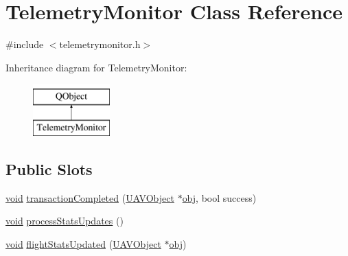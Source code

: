 \hypertarget{class_telemetry_monitor}{\section{Telemetry\-Monitor Class Reference}
\label{class_telemetry_monitor}
}


{\ttfamily \#include $<$telemetrymonitor.\-h$>$}

Inheritance diagram for Telemetry\-Monitor\-:\begin{figure}[H]
\begin{center}
\leavevmode
\includegraphics[height=2.000000cm]{class_telemetry_monitor}
\end{center}
\end{figure}
\subsection*{Public Slots}
\begin{DoxyCompactItemize}
\item 
\hyperlink{group___u_a_v_objects_plugin_ga444cf2ff3f0ecbe028adce838d373f5c}{void} \hyperlink{group___u_a_v_talk_plugin_ga2b5452341c351cd2d67c46469b855607}{transaction\-Completed} (\hyperlink{class_u_a_v_object}{U\-A\-V\-Object} $\ast$\hyperlink{glext_8h_a0c0d4701a6c89f4f7f0640715d27ab26}{obj}, bool success)
\item 
\hyperlink{group___u_a_v_objects_plugin_ga444cf2ff3f0ecbe028adce838d373f5c}{void} \hyperlink{group___u_a_v_talk_plugin_ga2e16b3d1a298f851879d22749d1e38e9}{process\-Stats\-Updates} ()
\item 
\hyperlink{group___u_a_v_objects_plugin_ga444cf2ff3f0ecbe028adce838d373f5c}{void} \hyperlink{group___u_a_v_talk_plugin_ga31c0b7ae632d68a5584d1f0696e35766}{flight\-Stats\-Updated} (\hyperlink{class_u_a_v_object}{U\-A\-V\-Object} $\ast$\hyperlink{glext_8h_a0c0d4701a6c89f4f7f0640715d27ab26}{obj})
\end{DoxyCompactItemize}
